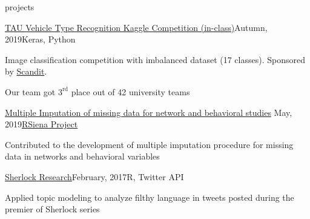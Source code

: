 \documentclass[]{resume} %
\begin{document}
\begin{rSection}{projects}
	
	
	\begin{rSubsection}{\href{https://github.com/schatt89/VehicleRecognition}{TAU Vehicle Type Recognition Kaggle Competition (in-class)}}{Autumn, 2019}{Keras, Python}{~}
	    \item Image classification competition with imbalanced dataset (17 classes). Sponsored by \href{https://www.scandit.com/}{Scandit}.
        \item Our team got $3^{\text{rd}}$ place out of 42 university teams\\[-1.5em]
	\end{rSubsection}
	
	\begin{rSubsection}{\hspace{-1ex} \href{https://www.stats.ox.ac.uk/~snijders/siena/MultipleImputationNetworkAndBehavior.html}{Multiple Imputation of missing data for network and behavioral studies} \hfill}{May, 2019}{\href{https://www.stats.ox.ac.uk/~snijders/siena/}{RSiena Project}}{~}
	    \item Contributed to the development of multiple imputation procedure for missing data in networks and behavioral variables \\[-4.5ex]
	\end{rSubsection}
	
	\begin{rSubsection}{\href{https://schatt89.github.io/sherlocknight/}{Sherlock Research}}{February, 2017}{R, Twitter API}{~} %
		\item Applied topic modeling to analyze filthy language in tweets posted during the premier of Sherlock series \\[-4.5ex]
	\end{rSubsection}
	

\end{rSection}
\end{document}
